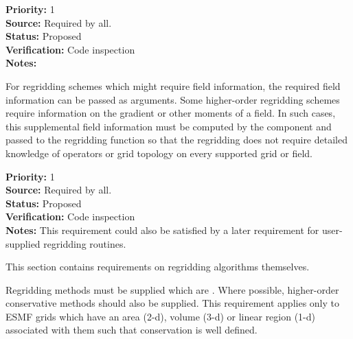 \begin{reqlist}
{\bf Priority:} 1 \\
{\bf Source:} Required by all. \\
{\bf Status:} Proposed \\
{\bf Verification:} Code inspection  \\
{\bf Notes:} 
\end{reqlist}


For regridding schemes which might require field information,
the required field information can be passed as arguments.
Some higher-order regridding schemes require information on the
gradient or other moments of a field.  In such cases, this 
supplemental field information must be computed by the component 
and passed to the regridding function so that the regridding does 
not require detailed knowledge of operators or grid topology on every
supported grid or field.

\begin{reqlist}
{\bf Priority:} 1 \\
{\bf Source:} Required by all. \\
{\bf Status:} Proposed \\
{\bf Verification:} Code inspection  \\
{\bf Notes:} This requirement could also be satisfied by a later requirement
             for user-supplied regridding routines.
\end{reqlist}


This section contains requirements on regridding algorithms themselves.


Regridding methods must be supplied which are
.  Where possible,
higher-order conservative methods should also be supplied.  This requirement
applies only to ESMF grids which have an area (2-d), volume (3-d) or
linear region (1-d) associated with them such that conservation is well
defined.

